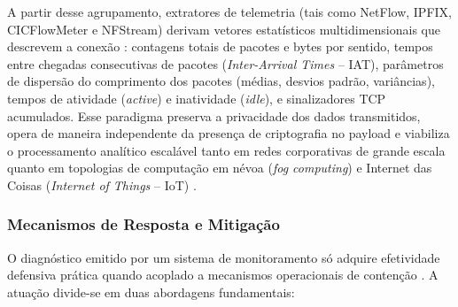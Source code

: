 \begin{itemize}
    A partir desse agrupamento, extratores de telemetria (tais como NetFlow, IPFIX, CICFlowMeter e NFStream) derivam vetores estatísticos multidimensionais que descrevem a conexão \cite{standard2021, AOUINI2022108719}: contagens totais de pacotes e bytes por sentido, tempos entre chegadas consecutivas de pacotes (\emph{Inter-Arrival Times} -- IAT), parâmetros de dispersão do comprimento dos pacotes (médias, desvios padrão, variâncias), tempos de atividade (\emph{active}) e inatividade (\emph{idle}), e sinalizadores TCP acumulados. Esse paradigma preserva a privacidade dos dados transmitidos, opera de maneira independente da presença de criptografia no payload e viabiliza o processamento analítico escalável tanto em redes corporativas de grande escala quanto em topologias de computação em névoa (\emph{fog computing}) e Internet das Coisas (\emph{Internet of Things} -- IoT) \cite{ciciot2023, emuiot2025, fogids2024}.
\end{itemize}

\subsubsection{Mecanismos de Resposta e Mitigação}

O diagnóstico emitido por um sistema de monitoramento só adquire efetividade defensiva prática quando acoplado a mecanismos operacionais de contenção \cite{advancedids2024, fogids2024}. A atuação divide-se em duas abordagens fundamentais:

